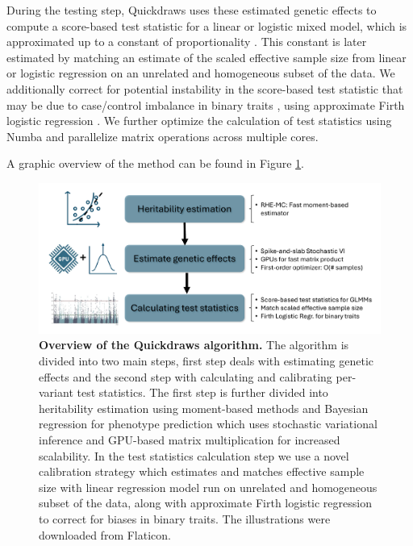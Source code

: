 %
During the testing step, Quickdraws uses these estimated genetic effects to compute a score-based test statistic for a linear or logistic mixed model, which is approximated up to a constant of proportionality \cite{svishcheva2012rapid, jakobsdottir2013mastor, loh2015efficient}.
%
This constant is later estimated by matching an estimate of the scaled effective sample size \cite{yang2011genomic} from linear or logistic regression on an unrelated and homogeneous subset of the data.
%
We additionally correct for potential instability in the score-based test statistic that may be due to case/control imbalance in binary traits \cite{zhou2018efficiently}, using approximate Firth logistic regression \cite{mbatchou2021computationally}.
%
We further optimize the calculation of test statistics using Numba \cite{lam2015numba} and parallelize matrix operations across multiple cores.

A graphic overview of the method can be found in Figure \ref{fig:qd_overview}.

\begin{figure}
    \centering
    \includegraphics[width=\linewidth]{figures/thesis_qd_overview.pdf}
    \caption{\textbf{Overview of the Quickdraws algorithm.} The algorithm is divided into two main steps, first step deals with estimating genetic effects and the second step with calculating and calibrating per-variant test statistics. The first step is further divided into heritability estimation using moment-based methods \cite{zhu2024ARGRHE} and Bayesian regression for phenotype prediction which uses stochastic variational inference and GPU-based matrix multiplication for increased scalability. In the test statistics calculation step we use a novel calibration strategy which estimates and matches effective sample size with linear regression model run on unrelated and homogeneous subset of the data, along with approximate Firth logistic regression to correct for biases in binary traits. The illustrations were downloaded from Flaticon.}
    \label{fig:qd_overview}
\end{figure}

